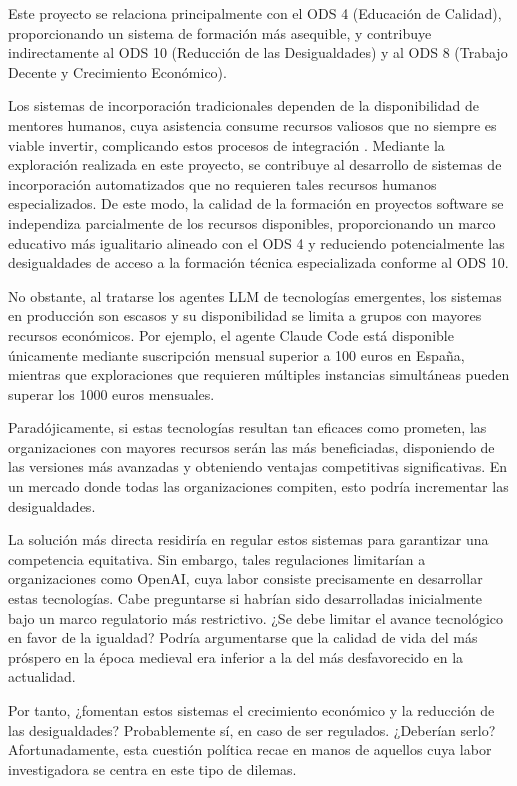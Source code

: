 Este proyecto se relaciona principalmente con el ODS 4 (Educación de Calidad), proporcionando un sistema de formación más asequible, y contribuye indirectamente al ODS 10 (Reducción de las Desigualdades) y al ODS 8 (Trabajo Decente y Crecimiento Económico).

Los sistemas de incorporación tradicionales dependen de la disponibilidad de mentores humanos, cuya asistencia consume recursos valiosos \cite{sim_ramp-up_1998} que no siempre es viable invertir, complicando estos procesos de integración \cite{steinmacher_systematic_2015}. Mediante la exploración realizada en este proyecto, se contribuye al desarrollo de sistemas de incorporación automatizados que no requieren tales recursos humanos especializados. De este modo, la calidad de la formación en proyectos software se independiza parcialmente de los recursos disponibles, proporcionando un marco educativo más igualitario alineado con el ODS 4 y reduciendo potencialmente las desigualdades de acceso a la formación técnica especializada conforme al ODS 10.

No obstante, al tratarse los agentes LLM de tecnologías emergentes, los sistemas en producción son escasos y su disponibilidad se limita a grupos con mayores recursos económicos. Por ejemplo, el agente Claude Code está disponible únicamente mediante suscripción mensual superior a 100 euros en España, mientras que exploraciones que requieren múltiples instancias simultáneas pueden superar los 1000 euros mensuales.

Paradójicamente, si estas tecnologías resultan tan eficaces como prometen, las organizaciones con mayores recursos serán las más beneficiadas, disponiendo de las versiones más avanzadas y obteniendo ventajas competitivas significativas. En un mercado donde todas las organizaciones compiten, esto podría incrementar las desigualdades.

La solución más directa residiría en regular estos sistemas para garantizar una competencia equitativa. Sin embargo, tales regulaciones limitarían a organizaciones como OpenAI, cuya labor consiste precisamente en desarrollar estas tecnologías. Cabe preguntarse si habrían sido desarrolladas inicialmente bajo un marco regulatorio más restrictivo. ¿Se debe limitar el avance tecnológico en favor de la igualdad? Podría argumentarse que la calidad de vida del más próspero en la época medieval era inferior a la del más desfavorecido en la actualidad.

Por tanto, ¿fomentan estos sistemas el crecimiento económico y la reducción de las desigualdades? Probablemente sí, en caso de ser regulados. ¿Deberían serlo? Afortunadamente, esta cuestión política recae en manos de aquellos cuya labor investigadora se centra en este tipo de dilemas.

